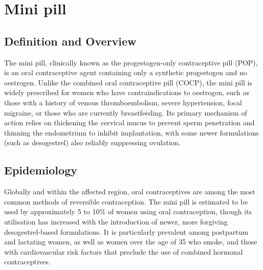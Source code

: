 \chapter{Mini pill}

\section*{Definition and Overview}
The mini pill, clinically known as the progestogen-only contraceptive pill (POP), is an oral contraceptive agent containing only a synthetic progestogen and no oestrogen. Unlike the combined oral contraceptive pill (COCP), the mini pill is widely prescribed for women who have contraindications to oestrogen, such as those with a history of venous thromboembolism, severe hypertension, focal migraine, or those who are currently breastfeeding. Its primary mechanism of action relies on thickening the cervical mucus to prevent sperm penetration and thinning the endometrium to inhibit implantation, with some newer formulations (such as desogestrel) also reliably suppressing ovulation.

\section*{Epidemiology}
Globally and within the affected region, oral contraceptives are among the most common methods of reversible contraception. The mini pill is estimated to be used by approximately 5 to 10\% of women using oral contraception, though its utilisation has increased with the introduction of newer, more forgiving desogestrel-based formulations. It is particularly prevalent among postpartum and lactating women, as well as women over the age of 35 who smoke, and those with cardiovascular risk factors that preclude the use of combined hormonal contraceptives.

